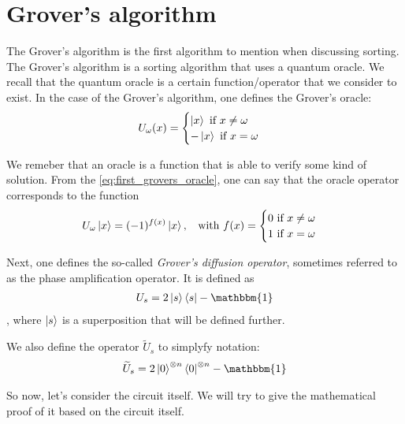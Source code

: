 \section*{Grover's algorithm}
The Grover's algorithm is the first algorithm to mention when discussing sorting. 
The Grover's algorithm is a sorting algorithm that uses a quantum oracle.
We recall that the quantum oracle is a certain function/operator that we consider 
to exist.
In the case of the Grover's algorithm, one defines the Grover's oracle:
\begin{equation}
  U_\omega (x) = 
  \begin{cases}
    \ket{x} \text{ if } x \neq \omega\\
    -\ket{x} \text{ if } x = \omega
  \end{cases}
  \label{eq:first_grovers_oracle}
\end{equation}

We remeber that an oracle is a function that is able to verify some kind of solution.
From the \autoref{eq:first_grovers_oracle}, one can say that the oracle operator corresponds 
to the function
\begin{equation}
  U_\omega\ket{x} = (-1)^{f(x)}\ket{x}, \;\; \text{ with } 
  f(x) = \begin{cases}
    0 \text{ if } x \neq \omega \\
    1 \text{ if } x = \omega
  \end{cases}
  \label{eq:grovers_algorithm}
\end{equation}

Next, one defines the so-called \textsl{Grover's diffusion operator}, sometimes referred to as the 
phase amplification operator. It is defined as 
\begin{gather}
  U_s = 2\ket{s}\bra{s} - \mathbbm{1}
  \label{eq:grovers_diffusion}
\end{gather}
, where $\ket{s}$ is a superposition that will be defined further.

We also define the operator $\widetilde{U}_s$ to simplyfy notation:
\begin{gather}
\widetilde{U}_s = 2\ket{0}^{\otimes n}\bra{0}^{\otimes n} - \mathbbm{1}
\end{gather}

So now, let's consider the circuit itself. We will try to give the mathematical proof of it based on the circuit itself.

